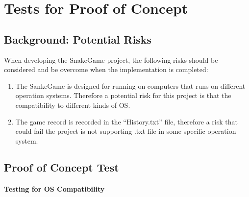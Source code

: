 \documentclass[12pt, titlepage]{article}
\begin{document}
\section{Tests for Proof of Concept}

\subsection{Background: Potential Risks}
When developing the SnakeGame project, the following risks should be considered and be overcome when the implementation is completed:
\begin{enumerate}
    \item The SankeGame is designed for running on computers that runs on different operation systems. Therefore a potential risk for this project is that the compatibility to different kinds of OS.
    \item The game record is recorded in the ``History.txt'' file, therefore a risk that could fail the project is not supporting .txt file in some specific operation system.
\end{enumerate}

\subsection{Proof of Concept Test}
		
\paragraph{Testing for OS Compatibility}
\end{document}
